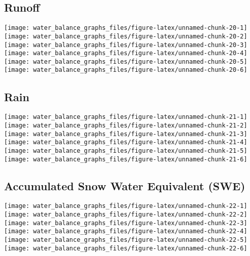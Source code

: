 \documentclass[
]{article}
\begin{document}
\hypertarget{runoff}{%
\subsection{Runoff}\label{runoff}}

\texttt{[image: water\_balance\_graphs\_files/figure-latex/unnamed-chunk-20-1]}
\texttt{[image: water\_balance\_graphs\_files/figure-latex/unnamed-chunk-20-2]}
\texttt{[image: water\_balance\_graphs\_files/figure-latex/unnamed-chunk-20-3]}
\texttt{[image: water\_balance\_graphs\_files/figure-latex/unnamed-chunk-20-4]}
\texttt{[image: water\_balance\_graphs\_files/figure-latex/unnamed-chunk-20-5]}
\texttt{[image: water\_balance\_graphs\_files/figure-latex/unnamed-chunk-20-6]}

\hypertarget{rain}{%
\subsection{Rain}\label{rain}}

\texttt{[image: water\_balance\_graphs\_files/figure-latex/unnamed-chunk-21-1]}
\texttt{[image: water\_balance\_graphs\_files/figure-latex/unnamed-chunk-21-2]}
\texttt{[image: water\_balance\_graphs\_files/figure-latex/unnamed-chunk-21-3]}
\texttt{[image: water\_balance\_graphs\_files/figure-latex/unnamed-chunk-21-4]}
\texttt{[image: water\_balance\_graphs\_files/figure-latex/unnamed-chunk-21-5]}
\texttt{[image: water\_balance\_graphs\_files/figure-latex/unnamed-chunk-21-6]}

\hypertarget{accumulated-snow-water-equivalent-swe}{%
\subsection{Accumulated Snow Water Equivalent
(SWE)}\label{accumulated-snow-water-equivalent-swe}}

\texttt{[image: water\_balance\_graphs\_files/figure-latex/unnamed-chunk-22-1]}
\texttt{[image: water\_balance\_graphs\_files/figure-latex/unnamed-chunk-22-2]}
\texttt{[image: water\_balance\_graphs\_files/figure-latex/unnamed-chunk-22-3]}
\texttt{[image: water\_balance\_graphs\_files/figure-latex/unnamed-chunk-22-4]}
\texttt{[image: water\_balance\_graphs\_files/figure-latex/unnamed-chunk-22-5]}
\texttt{[image: water\_balance\_graphs\_files/figure-latex/unnamed-chunk-22-6]}
\end{document}
